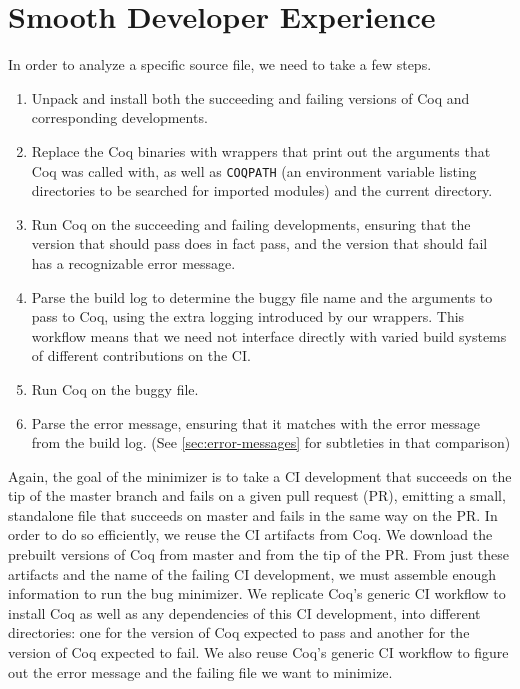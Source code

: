\documentclass[a4paper,USenglish,cleveref,autoref,thm-restate]{lipics-v2021}
\begin{document}
\section{Smooth Developer Experience}\label{sec:smooth-dev-experience}

In order to analyze a specific source file, we need to take a few steps.
\begin{enumerate}
\item Unpack and install both the succeeding and failing versions of Coq and corresponding developments.
\item Replace the Coq binaries with wrappers that print out the arguments that Coq was called with, as well as \texttt{COQPATH} (an environment variable listing directories to be searched for imported modules) and the current directory.
\item Run Coq on the succeeding and failing developments, ensuring that the version that should pass does in fact pass, and the version that should fail has a recognizable error message.
\item Parse the build log to determine the buggy file name and the arguments to pass to Coq, using the extra logging introduced by our wrappers.
  This workflow means that we need not interface directly with varied build systems of different contributions on the CI.
\item Run Coq on the buggy file.
\item Parse the error message, ensuring that it matches with the error message from the build log.
  (See \autoref{sec:error-messages} for subtleties in that comparison)
\end{enumerate}

Again, the goal of the minimizer is to take a CI development that succeeds on the tip of the master branch and fails on a given pull request (PR), emitting a small, standalone file that succeeds on master and fails in the same way on the PR.
In order to do so efficiently, we reuse the CI artifacts from Coq.
We download the prebuilt versions of Coq from master and from the tip of the PR.
From just these artifacts and the name of the failing CI development, we must assemble enough information to run the bug minimizer.
We replicate Coq's generic CI workflow to install Coq as well as any dependencies of this CI development, into different directories: one for the version of Coq expected to pass and another for the version of Coq expected to fail.
We also reuse Coq's generic CI workflow to figure out the error message and the failing file we want to minimize.
\end{document}
